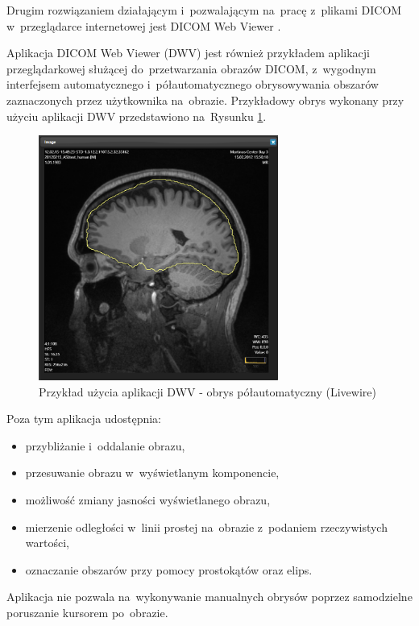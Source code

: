 \documentclass[a4paper,11pt,twoside,openright]{report}
\theoremstyle{definition}
\begin{document}
Drugim rozwiązaniem działającym i~pozwalającym na~pracę z~plikami DICOM w~przeglądarce
internetowej jest DICOM Web Viewer \cite{DWV}.

Aplikacja DICOM Web Viewer (DWV) jest również przykładem aplikacji
przeglądarkowej służącej do~przetwarzania obrazów DICOM, z~wygodnym interfejsem
automatycznego i~półautomatycznego obrysowywania obszarów zaznaczonych
przez użytkownika na~obrazie. Przykładowy obrys wykonany przy użyciu aplikacji
DWV przedstawiono na~Rysunku \ref{fig:DWV-interface}.

\begin{figure}[tb!]
	\center
	\includegraphics[width=0.7\textwidth]{DWV-interface}
	\caption{Przykład użycia aplikacji DWV - obrys półautomatyczny (Livewire) \cite{DWV}}
    	\label{fig:DWV-interface}
\end{figure}

 Poza tym aplikacja udostępnia:
\begin{itemize}[noitemsep]
\item przybliżanie i~oddalanie obrazu,
\item przesuwanie obrazu w~wyświetlanym komponencie,
\item możliwość zmiany jasności wyświetlanego obrazu,
\item mierzenie odległości w~linii prostej na~obrazie z~podaniem rzeczywistych wartości,
\item oznaczanie obszarów przy pomocy prostokątów oraz elips.
\end{itemize}

Aplikacja nie pozwala na~wykonywanie manualnych obrysów poprzez samodzielne
poruszanie kursorem po~obrazie.
\end{document}
